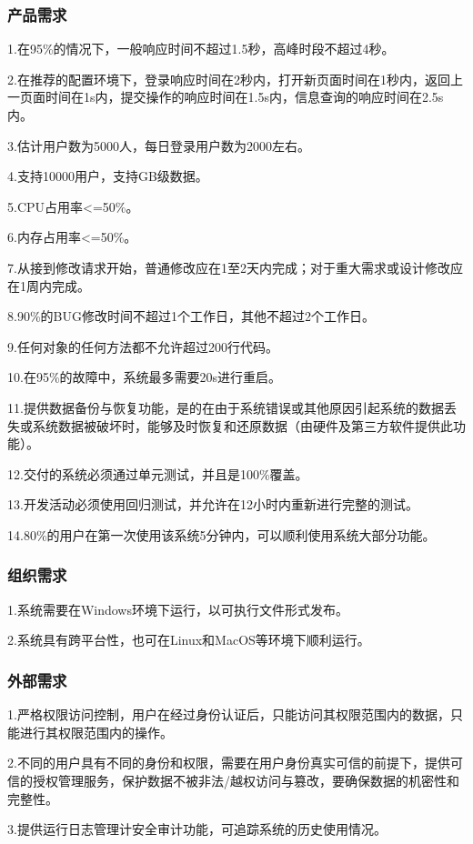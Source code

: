 \documentclass[a4paper,UTF8]{article}
\begin{document}
\subsubsection{产品需求}
1.在95\%的情况下，一般响应时间不超过1.5秒，高峰时段不超过4秒。

2.在推荐的配置环境下，登录响应时间在2秒内，打开新页面时间在1秒内，返回上一页面时间在1s内，提交操作的响应时间在1.5s内，信息查询的响应时间在2.5s内。

3.估计用户数为5000人，每日登录用户数为2000左右。

4.支持10000用户，支持GB级数据。

5.CPU占用率<=50\%。

6.内存占用率<=50\%。

7.从接到修改请求开始，普通修改应在1至2天内完成；对于重大需求或设计修改应在1周内完成。

8.90\%的BUG修改时间不超过1个工作日，其他不超过2个工作日。

9.任何对象的任何方法都不允许超过200行代码。

10.在95\%的故障中，系统最多需要20s进行重启。

11.提供数据备份与恢复功能，是的在由于系统错误或其他原因引起系统的数据丢失或系统数据被破坏时，能够及时恢复和还原数据（由硬件及第三方软件提供此功能）。

12.交付的系统必须通过单元测试，并且是100\%覆盖。

13.开发活动必须使用回归测试，并允许在12小时内重新进行完整的测试。

14.80\%的用户在第一次使用该系统5分钟内，可以顺利使用系统大部分功能。

\subsubsection{组织需求}
1.系统需要在Windows环境下运行，以可执行文件形式发布。

2.系统具有跨平台性，也可在Linux和MacOS等环境下顺利运行。

\subsubsection{外部需求}
1.严格权限访问控制，用户在经过身份认证后，只能访问其权限范围内的数据，只能进行其权限范围内的操作。

2.不同的用户具有不同的身份和权限，需要在用户身份真实可信的前提下，提供可信的授权管理服务，保护数据不被非法/越权访问与篡改，要确保数据的机密性和完整性。

3.提供运行日志管理计安全审计功能，可追踪系统的历史使用情况。
\end{document}
